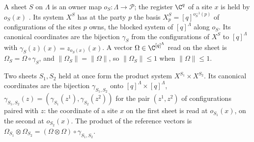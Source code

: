 \begin{definition}
    \label{def:party_sheet}
    \leanok
    A sheet $S$ on $\Lambda$ is an owner map $o_S:\Lambda\to\mathcal P$; the register $\C^q$ of
    a site $x$ is held by $o_S(x)$ \cite[Section~6]{OpenAI2026PolynomialPEPS}. Its system $X^S$
    has at the party $p$ the basis $X^S_p=[q]^{o_S^{-1}(p)}$ of configurations of the sites $p$
    owns, the blocked system of $[q]^\Lambda$ along $o_S$. Its canonical coordinates are the
    bijection $\gamma_S$ from the configurations of $X^S$ to $[q]^\Lambda$ with
    $\gamma_S(z)(x)=z_{o_S(x)}(x)$. A vector $\Omega\in\C^{[q]^\Lambda}$ read on the sheet is
    $\Omega_S=\Omega\circ\gamma_S$, and $\lVert\Omega_S\rVert=\lVert\Omega\rVert$, so
    $\lVert\Omega_S\rVert\leq1$ when $\lVert\Omega\rVert\leq1$.

    Two sheets $S_1,S_2$ held at once form the product system $X^{S_1}\times X^{S_2}$. Its
    canonical coordinates are the bijection $\gamma_{S_1,S_2}$ onto $[q]^\Lambda\times[q]^\Lambda$,
    $\gamma_{S_1,S_2}(z)=(\gamma_{S_1}(z^1),\gamma_{S_2}(z^2))$ for the pair $(z^1,z^2)$ of
    configurations paired with $z$: the coordinate of a site $x$ on the first sheet is read at
    $o_{S_1}(x)$, on the second at $o_{S_2}(x)$. The product of the reference vectors is
    $\Omega_{S_1}\otimes\Omega_{S_2}=(\Omega\otimes\Omega)\circ\gamma_{S_1,S_2}$.
\end{definition}

